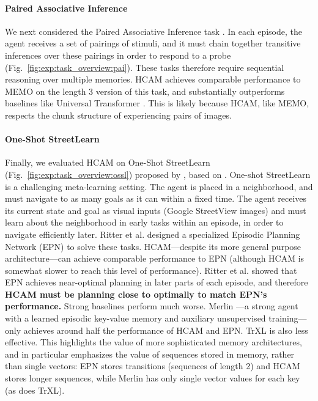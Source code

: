 \documentclass{article}
\begin{document}
\paragraph{Paired Associative Inference}
We next considered the Paired Associative Inference task \citep{banino2020memo}. In each episode, the agent receives a set of pairings of stimuli, and it must chain together transitive inferences over these pairings in order to respond to a probe (Fig.\ \ref{fig:exp:task_overview:pai}). These tasks therefore require sequential reasoning over multiple memories. HCAM achieves comparable performance to MEMO on the length 3 version of this task, and substantially outperforms baselines like Universal Transformer \citep{dehghani2018universal}. This is likely because HCAM, like MEMO, respects the chunk structure of experiencing pairs of images.\vspace{-0.5em}

\paragraph{One-Shot StreetLearn}
Finally, we evaluated HCAM on One-Shot StreetLearn (Fig.\ \ref{fig:exp:task_overview:ossl}) proposed by \citet{ritter2020rapid}, based on \citet{mirowski2019streetlearn}. One-shot StreetLearn is a challenging meta-learning setting. The agent is placed in a neighborhood, and must navigate to as many goals as it can within a fixed time. The agent receives its current state and goal as visual inputs (Google StreetView images) and must learn about the neighborhood in early tasks within an episode, in order to navigate efficiently later. Ritter et al. designed a specialized Episodic Planning Network (EPN) to solve these tasks. HCAM---despite its more general purpose architecture---can achieve comparable performance to EPN (although HCAM is somewhat slower to reach this level of performance). Ritter et al. showed that EPN achieves near-optimal planning in later parts of each episode, and therefore \textbf{HCAM must be planning close to optimally to match EPN's performance.} Strong baselines perform much worse. Merlin \citep{wayne2018unsupervised}---a strong agent with a learned episodic key-value memory and auxiliary unsupervised training---only achieves around half the performance of HCAM and EPN. TrXL is also less effective. This highlights the value of more sophisticated memory architectures, and in particular emphasizes the value of sequences stored in memory, rather than single vectors: EPN stores transitions (sequences of length 2) and HCAM stores longer sequences, while Merlin has only single vector values for each key (as does TrXL). 
\end{document}
